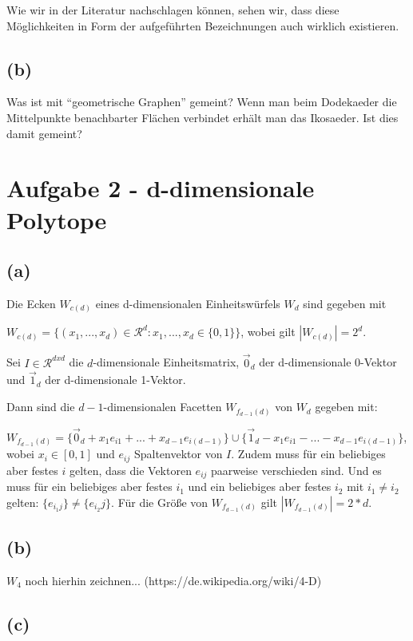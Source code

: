 \documentclass[a4paper]{article}
\begin{document}
 Wie wir in der Literatur nachschlagen können, sehen wir, dass diese Möglichkeiten 
 in Form der aufgeführten Bezeichnungen auch wirklich existieren.
  

\subsection*{(b)}
Was ist mit "`geometrische Graphen"' gemeint? 
Wenn man beim Dodekaeder die Mittelpunkte benachbarter Flächen verbindet erhält man
das Ikosaeder. Ist dies damit gemeint?

\section*{Aufgabe 2 - d-dimensionale Polytope}

\subsection*{(a)}
Die Ecken $W_{c(d)}$ eines d-dimensionalen Einheitswürfels $W_d$ sind gegeben mit

$W_{c(d)}=\{(x_1, ..., x_d) \in \mathcal{R}^d : x_1, ..., x_d \in \{0, 1\}\}$, 
wobei gilt $|W_{c(d)}| = 2^d$.

Sei $I \in \mathcal{R}^{d x d}$ die $d$-dimensionale Einheitsmatrix, 
$\vec{0}_d$ der d-dimensionale 0-Vektor und $\vec{1}_d$ der d-dimensionale
1-Vektor.

Dann sind die $d-1$-dimensionalen Facetten $W_{f_{d-1}(d)}$ von $W_d$ gegeben mit:

$W_{f_{d-1}(d)} = \{\vec{0}_d + x_1 e_{i1} + ... + x_{d-1} e_{i(d-1)}\} \cup \{\vec{1}_d - x_1 e_{i1} - ... - x_{d-1} e_{i(d-1)}\}$, wobei $x_i \in [0,1]$ und $e_{ij}$ Spaltenvektor von $I$.
Zudem muss für ein beliebiges aber festes $i$ gelten, dass die Vektoren $e_{ij}$ paarweise
verschieden sind. Und es muss für ein beliebiges aber festes $i_1$ 
und ein beliebiges aber festes $i_2$ mit $i_1 \neq i_2$ gelten: 
$\{e_{i_1j}\} \neq \{e_{i_2}j\}$.
Für die Größe von $W_{f_{d-1}(d)}$ gilt $|W_{f_{d-1}(d)}| = 2*d$.

\subsection*{(b)}
$W_4$ noch hierhin zeichnen... (https://de.wikipedia.org/wiki/4-D)

\subsection*{(c)}
\end{document}
